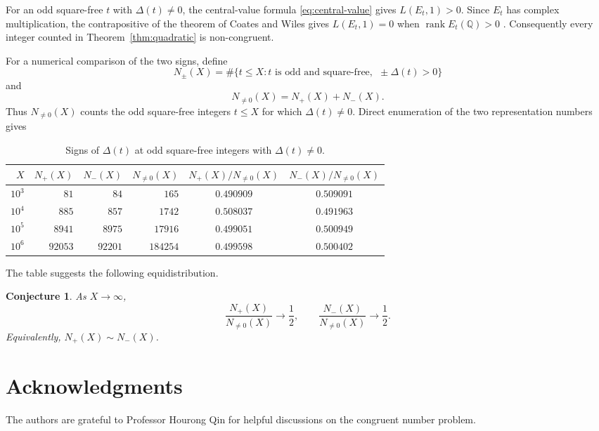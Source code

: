 \documentclass[11pt]{amsart}
\newtheorem{conjecture}[theorem]{Conjecture}
\theoremstyle{remark}
\newcommand{\Q}{\mathbb Q}
\begin{document}
For an odd square-free $t$ with $\Delta(t)\ne0$, the central-value formula
\eqref{eq:central-value} gives $L(E_t,1)>0$. Since $E_t$ has complex
multiplication, the contrapositive of the theorem of Coates and Wiles
gives $L(E_t,1)=0$ when $\operatorname{rank}E_t(\Q)>0$
\cite{CoatesWiles}. Consequently every
integer counted in Theorem~\ref{thm:quadratic} is non-congruent.

For a numerical comparison of the two signs, define
\[
N_\pm(X)=\#\{t\leq X:t\text{ is odd and square-free},\
             \ \pm\Delta(t)>0\}
\]
and
\[
N_{\ne0}(X)=N_+(X)+N_-(X).
\]
Thus $N_{\ne0}(X)$ counts the odd square-free integers $t\le X$ for which
$\Delta(t)\ne0$. Direct enumeration of the two representation numbers gives
\begin{table}[ht]
\centering
\small
\setlength{\tabcolsep}{4pt}
\begin{tabular}{rrrrcc}
\toprule
$X$ & $N_+(X)$ & $N_-(X)$ & $N_{\ne0}(X)$
& $N_+(X)/N_{\ne0}(X)$ & $N_-(X)/N_{\ne0}(X)$ \\
\midrule
$10^3$ & $81$ & $84$ & $165$ & $0.490909$ & $0.509091$ \\
$10^4$ & $885$ & $857$ & $1742$ & $0.508037$ & $0.491963$ \\
$10^5$ & $8941$ & $8975$ & $17916$ & $0.499051$ & $0.500949$ \\
$10^6$ & $92053$ & $92201$ & $184254$ & $0.499598$ & $0.500402$ \\
\bottomrule
\end{tabular}
\caption{Signs of $\Delta(t)$ at odd square-free integers with
$\Delta(t)\ne0$.}
\label{tab:numerical-signs}
\end{table}

The table suggests the following equidistribution.

\begin{conjecture}\label{conj:sign-equidistribution}
As $X\to\infty$,
\[
\frac{N_+(X)}{N_{\ne0}(X)}\longrightarrow\frac12,
\qquad
\frac{N_-(X)}{N_{\ne0}(X)}\longrightarrow\frac12.
\]
Equivalently, $N_+(X)\sim N_-(X)$.
\end{conjecture}

\section*{Acknowledgments}
The authors are grateful to  Professor Hourong Qin for helpful discussions on the congruent number problem.
\end{document}
